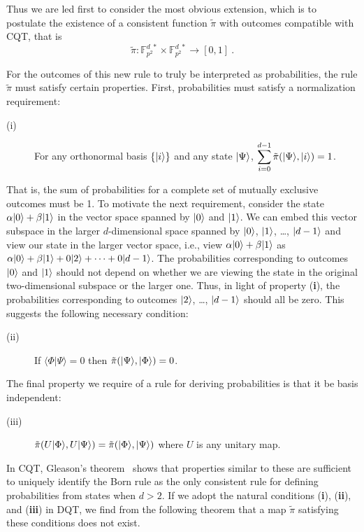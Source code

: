 \documentclass[english,12pt]{iopart}
\theoremstyle{plain}
\theoremstyle{definition}
\newcommand{\braket}[2]{\langle{#1}|{#2}\rangle}
\newcommand{\ffzd}[1]{{\mathbb{F}^{d\;*}_{#1}}}
\newcommand{\dpt}{{\tilde{\pi}}}
\begin{document}
Thus we are led first to consider the most obvious extension, which is
to postulate the existence of a consistent function $\dpt$ with
outcomes compatible with CQT, that is
\[\dpt\colon \ffzd{p^2}\times \ffzd{p^2}
\longrightarrow [0,1]\ . \]

For the outcomes of this new rule to truly be interpreted as
probabilities, the rule $\dpt$ must satisfy certain properties.
First, probabilities must satisfy a normalization requirement:
\begin{description}
\item[(i)]  For any orthonormal basis $\{{\left\vert{i}\right\rangle}\}$ and any state
  ${\left\vert{\Psi}\right\rangle}$, $\displaystyle \sum_{i=0}^{d-1} \dpt(\ket{\Psi},\ket{i})=1$.
\end{description}
That is, the sum of probabilities for a complete set of mutually
exclusive outcomes must be 1.  To motivate the next requirement,
consider the state $\alpha{\left\vert{0}\right\rangle}+\beta{\left\vert{1}\right\rangle}$ in the vector space
spanned by ${\left\vert{0}\right\rangle}$ and ${\left\vert{1}\right\rangle}$.  We can embed this vector subspace
in the larger $d$-dimensional space spanned by ${\left\vert{0}\right\rangle}$, ${\left\vert{1}\right\rangle}$,
\ldots, ${\left\vert{d-1}\right\rangle}$ and view our state in the larger vector space,
i.e., view $\alpha{\left\vert{0}\right\rangle}+\beta{\left\vert{1}\right\rangle}$ as
$\alpha{\left\vert{0}\right\rangle}+\beta{\left\vert{1}\right\rangle} + 0{\left\vert{2}\right\rangle} + \cdots+ 0{\left\vert{d-1}\right\rangle}$.  The
probabilities corresponding to outcomes ${\left\vert{0}\right\rangle}$ and ${\left\vert{1}\right\rangle}$ should
not depend on whether we are viewing the state in the original
two-dimensional subspace or the larger one. Thus, in light of property
({\bf i}), the probabilities corresponding to outcomes ${\left\vert{2}\right\rangle}$,
\ldots, ${\left\vert{d-1}\right\rangle}$ should all be zero. This suggests the following
necessary condition:
\begin{description}
\item[(ii)]
If $\braket{\Phi}{\Psi}=0$ then $\dpt(\ket{\Psi},\ket{\Phi})=0$.
\end{description}
The final property we require of a rule for deriving probabilities is
that it be basis independent:
\begin{description}
\item[(iii)]
$\dpt(U\ket{\Phi},U\ket{\Psi})=\dpt(\ket{\Phi},\ket{\Psi})$ 
where $U$ is any unitary map.
\end{description}

In CQT, Gleason's theorem~\cite{gleason1957} shows that properties
similar to these are sufficient to uniquely identify the Born rule as
the only consistent rule for defining probabilities from states when
$d>2$.  If we adopt the natural conditions ({\bf i}), ({\bf ii}), and
({\bf iii}) in DQT, we find from the following theorem that a map
$\dpt$ satisfying these conditions does not exist.
\end{document}
